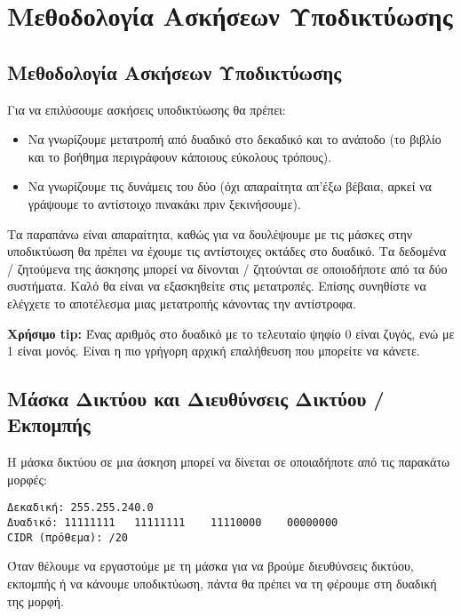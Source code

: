 \chapter{Μεθοδολογία Ασκήσεων Υποδικτύωσης}
\newpage
\section{Μεθοδολογία Ασκήσεων Υποδικτύωσης}

Για να επιλύσουμε ασκήσεις υποδικτύωσης θα πρέπει:

\begin{itemize}
\item Να γνωρίζουμε μετατροπή από δυαδικό στο δεκαδικό και το ανάποδο (το βιβλίο και το βοήθημα περιγράφουν κάποιους εύκολους τρόπους).
\item Να γνωρίζουμε τις δυνάμεις του δύο (όχι απαραίτητα απ’έξω βέβαια, αρκεί να γράψουμε το αντίστοιχο πινακάκι πριν ξεκινήσουμε).
\end{itemize}

Τα παραπάνω είναι απαραίτητα, καθώς για να δουλέψουμε με τις μάσκες στην υποδικτύωση θα πρέπει να έχουμε τις αντίστοιχες οκτάδες στο δυαδικό. Τα δεδομένα / ζητούμενα της άσκησης μπορεί να δίνονται / ζητούνται σε οποιοδήποτε από τα δύο συστήματα. Καλό θα είναι να εξασκηθείτε στις μετατροπές. Επίσης συνηθίστε να ελέγχετε το αποτέλεσμα μιας μετατροπής κάνοντας την αντίστροφα.

\begin{inthebox}
\textbf{Χρήσιμο tip:} Ένας αριθμός στο δυαδικό με το τελευταίο ψηφίο 0 είναι ζυγός, ενώ με 1 είναι μονός. Είναι η πιο γρήγορη αρχική επαλήθευση που μπορείτε να κάνετε.\\
\end{inthebox}

\section*{Μάσκα Δικτύου και Διευθύνσεις Δικτύου / Εκπομπής}

Η μάσκα δικτύου σε μια άσκηση μπορεί να δίνεται σε οποιαδήποτε από τις παρακάτω μορφές:

\begin{verbatim}
Δεκαδική: 255.255.240.0
Δυαδικό: 11111111	11111111	11110000	00000000
CIDR (πρόθεμα): /20
\end{verbatim}

Όταν θέλουμε να εργαστούμε με τη μάσκα για να βρούμε διευθύνσεις δικτύου, εκπομπής ή να κάνουμε υποδικτύωση, πάντα θα πρέπει να τη φέρουμε στη δυαδική της μορφή.

